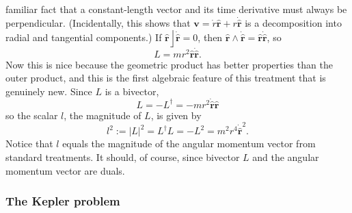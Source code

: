 \documentclass{utarticle}
\DeclareMathOperator{\lin}{\rfloor}
\DeclareMathOperator{\out}{\wedge}
\newcommand{\rev}[1]{\ensuremath{#1^\dagger}}
\begin{document}
familiar fact that a constant-length vector and its time derivative must always 
be perpendicular.  (Incidentally, this shows that $\bm{v}= \dot{r} \bm{\hat{r}} + 
r \dot{\bm{\hat{r}}}$ is a decomposition into radial and tangential components.)  
If $\bm{\hat{r}} \lin \dot{\bm{\hat{r}}} = 0$, then $\bm{\hat{r}} \out \dot{\bm{\hat{r}}} 
= \bm{\hat{r}} \dot{\bm{\hat{r}}}$, so
\begin{equation} 
L = m r^2 \bm{\hat{r}} \dot{\bm{\hat{r}}}. 
\label{Ldef}
\end{equation}
Now this is nice because the geometric product has better properties than the 
outer product, and this is the first algebraic feature of this treatment that 
is genuinely new.  Since $L$ is a bivector,
\begin{equation}
L = -\rev{L} = -mr^2 \dot{\bm{\hat{r}}} \bm{\hat{r}}
\end{equation}
so the scalar $l$, the magnitude of $L$, is given by
\begin{equation}
l^2 := |L|^2 = \rev{L}L = -L^2 = m^2 r^4 \dot{\bm{\hat{r}}}^2.
\end{equation}
Notice that $l$ equals the magnitude of the angular momentum vector from standard
treatments.  It should, of course, since bivector $L$ and the angular momentum
vector are duals.

\subsubsection{The Kepler problem}
\end{document}
